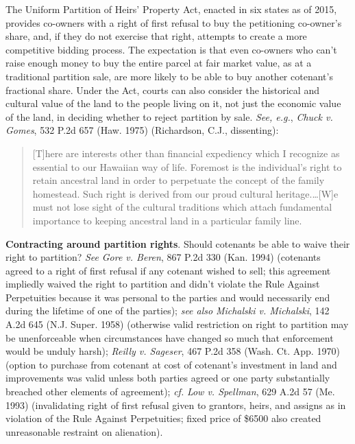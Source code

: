 The Uniform Partition of Heirs' Property Act, enacted in six states as of 2015,
provides co-owners with a right of first refusal to buy the petitioning
co-owner's share, and, if they do not exercise that right, attempts to create a
more competitive bidding process. The expectation is that even co-owners who
can't raise enough money to buy the entire parcel at fair market value, as at a
traditional partition sale, are more likely to be able to buy another
cotenant's fractional share. Under the Act, courts can also consider the
historical and cultural value of the land to the people living on it, not just
the economic value of the land, in deciding whether to reject partition by
sale. \emph{See, e.g.}, \emph{Chuck v. Gomes}, 532 P.2d 657 (Haw. 1975)
(Richardson, C.J., dissenting):
\begin{quote}
[T]here are interests other than financial expediency which I recognize as
essential to our Hawaiian way of life. Foremost is the individual's right to
retain ancestral land in order to perpetuate the concept of the family
homestead. Such right is derived from our proud cultural heritage.\ldots [W]e
must not lose sight of the cultural traditions which attach fundamental
importance to keeping ancestral land in a particular family line.
\end{quote}

\item \textbf{Contracting around partition rights}. Should cotenants be able to
waive their right to partition? \textit{See} \emph{Gore v. Beren}, 867 P.2d 330
(Kan. 1994) (cotenants agreed to a right of first refusal if any cotenant wished
to sell; this agreement impliedly waived the right to partition and didn't
violate the Rule Against Perpetuities because it was personal to the parties and
would necessarily end during the lifetime of one of the parties); \textit{see
also} \emph{Michalski v. Michalski}, 142 A.2d 645 (N.J. Super. 1958) (otherwise
valid restriction on right to partition may be unenforceable when circumstances
have changed so much that enforcement would be unduly harsh); \emph{Reilly v.
Sageser}, 467 P.2d 358 (Wash. Ct. App. 1970) (option to purchase from cotenant
at cost of cotenant's investment in land and improvements was valid unless both
parties agreed or one party substantially breached other elements of agreement);
\textit{cf.} \emph{Low v. Spellman}, 629 A.2d 57 (Me. 1993) (invalidating right
of first refusal given to grantors, heirs, and assigns as in violation of the
Rule Against Perpetuities; fixed price of \$6500 also created unreasonable
restraint on alienation).


